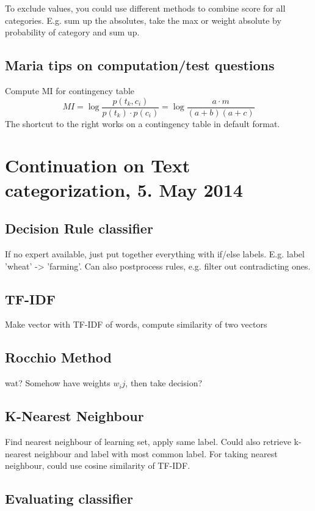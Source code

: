 \documentclass[11pt]{article}
\begin{document}
To exclude values, you could use different methods to combine score for all categories. E.g. sum up the absolutes, take the max or weight absolute by probability of category and sum up.

\subsection{Maria tips on computation/test questions}
Compute MI for contingency table
\begin{equation}
	MI = \log \frac{p(t_k, c_i)}{p(t_k)\cdot p(c_i)} = \log \frac{a \cdot m}{(a + b) (a + c)}
\end{equation}
The shortcut to the right works on a contingency table in default format. 

\section{Continuation on Text categorization, 5. May 2014}
\subsection{Decision Rule classifier}
If no expert available, just put together everything with if/else labels. E.g. label 'wheat' -> 'farming'. Can also postprocess rules, e.g. filter out contradicting ones. 

\subsection{TF-IDF }
Make vector with TF-IDF of words, compute similarity of two vectors

\subsection{Rocchio Method}
wat? Somehow have weights $w_ij$, then take decision?

\subsection{K-Nearest Neighbour}
Find nearest neighbour of learning set, apply same label. Could also retrieve k-nearest
neighbour and label with most common label. For taking nearest neighbour, could use cosine
similarity of TF-IDF.

\subsection{Evaluating classifier}
\end{document}
